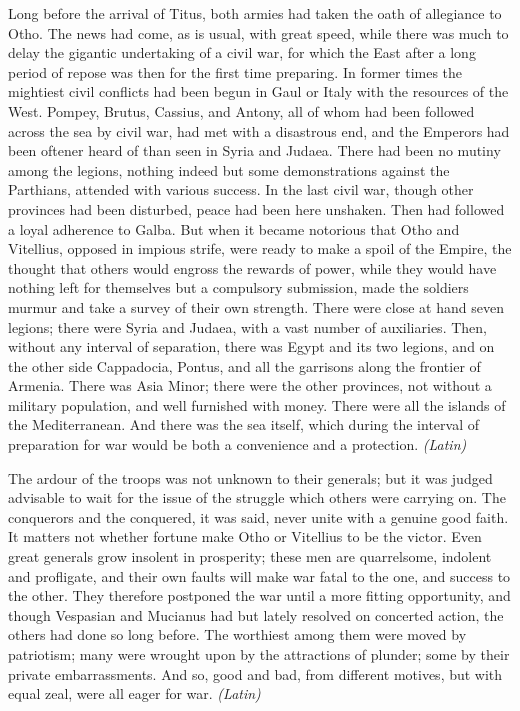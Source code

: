 Long before the arrival of Titus, both armies had taken the oath of allegiance to Otho. The news had come, as is usual, with great speed, while there was much to delay the gigantic undertaking of a civil war, for which the East after a long period of repose was then for the first time preparing. In former times the mightiest civil conflicts had been begun in Gaul or Italy with the resources of the West. Pompey, Brutus, Cassius, and Antony, all of whom had been followed across the sea by civil war, had met with a disastrous end, and the Emperors had been oftener heard of than seen in Syria and Judaea. There had been no mutiny among the legions, nothing indeed but some demonstrations against the Parthians, attended with various success. In the last civil war, though other provinces had been disturbed, peace had been here unshaken. Then had followed a loyal adherence to Galba. But when it became notorious that Otho and Vitellius, opposed in impious strife, were ready to make a spoil of the Empire, the thought that others would engross the rewards of power, while they would have nothing left for themselves but a compulsory submission, made the soldiers murmur and take a survey of their own strength. There were close at hand seven legions; there were Syria and Judaea, with a vast number of auxiliaries. Then, without any interval of separation, there was Egypt and its two legions, and on the other side Cappadocia, Pontus, and all the garrisons along the frontier of Armenia. There was Asia Minor; there were the other provinces, not without a military population, and well furnished with money. There were all the islands of the Mediterranean. And there was the sea itself, which during the interval of preparation for war would be both a convenience and a protection. \emph{(Latin)}


The ardour of the troops was not unknown to their generals; but it was judged advisable to wait for the issue of the struggle which others were carrying on. The conquerors and the conquered, it was said, never unite with a genuine good faith. It matters not whether fortune make Otho or Vitellius to be the victor. Even great generals grow insolent in prosperity; these men are quarrelsome, indolent and profligate, and their own faults will make war fatal to the one, and success to the other. They therefore postponed the war until a more fitting opportunity, and though Vespasian and Mucianus had but lately resolved on concerted action, the others had done so long before. The worthiest among them were moved by patriotism; many were wrought upon by the attractions of plunder; some by their private embarrassments. And so, good and bad, from different motives, but with equal zeal, were all eager for war. \emph{(Latin)}

